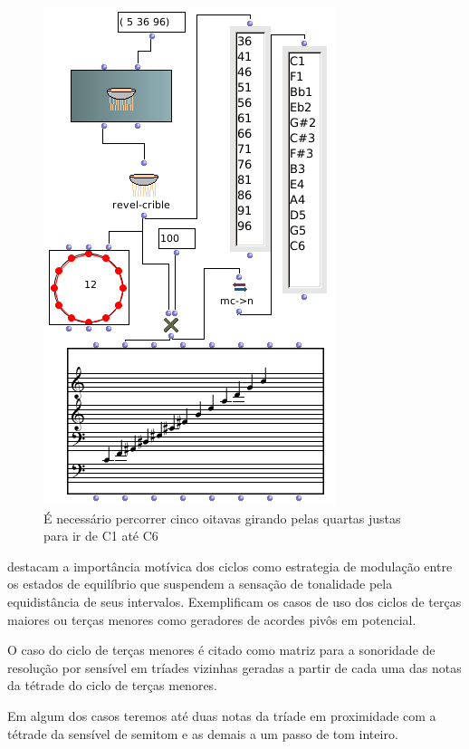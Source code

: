\documentclass[
	12pt,				%
	openright,			%
	twoside,			%
	a4paper,			%
	english,			%
	french,				%
	spanish,			%
	brazil				%
	]{abntex2}
\begin{document}
\begin{figure}[!h]
	\caption{\label{fig_grafico}É necessário percorrer cinco oitavas girando pelas quartas justas para ir de C1 até C6  }
	\begin{center}
	    \includegraphics[scale=0.5]{ciclos/5JcrivosOM.png}
	\end{center}
\end{figure}

 destacam a importância motívica dos ciclos como estrategia de modulação entre os estados de equilíbrio que suspendem a sensação de tonalidade pela equidistância de seus intervalos. Exemplificam os casos de uso dos ciclos de terças maiores ou terças menores como geradores de acordes pivôs em potencial.

O caso do ciclo de terças menores é citado como matriz para a sonoridade de resolução por sensível em tríades vizinhas geradas a partir de cada uma das notas da tétrade do ciclo de terças menores. 

Em algum dos casos teremos até duas notas da tríade em proximidade com a tétrade da sensível de semitom e as demais a um passo de tom inteiro. 
\end{document}
